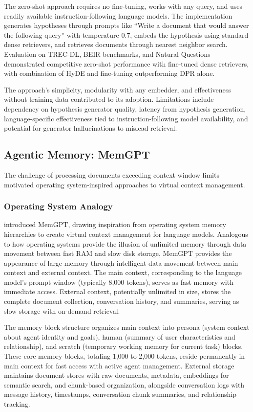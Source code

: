 The zero-shot approach requires no fine-tuning, works with any query, and uses readily available instruction-following language models. The implementation generates hypotheses through prompts like ``Write a document that would answer the following query'' with temperature 0.7, embeds the hypothesis using standard dense retrievers, and retrieves documents through nearest neighbor search. Evaluation on TREC-DL, BEIR benchmarks, and Natural Questions demonstrated competitive zero-shot performance with fine-tuned dense retrievers, with combination of HyDE and fine-tuning outperforming DPR alone.

The approach's simplicity, modularity with any embedder, and effectiveness without training data contributed to its adoption. Limitations include dependency on hypothesis generator quality, latency from hypothesis generation, language-specific effectiveness tied to instruction-following model availability, and potential for generator hallucinations to mislead retrieval.

\subsection{Agentic Memory: MemGPT}

The challenge of processing documents exceeding context window limits motivated operating system-inspired approaches to virtual context management.

\subsubsection{Operating System Analogy}

\citet{packer2023memgpt} introduced MemGPT, drawing inspiration from operating system memory hierarchies to create virtual context management for language models. Analogous to how operating systems provide the illusion of unlimited memory through data movement between fast RAM and slow disk storage, MemGPT provides the appearance of large memory through intelligent data movement between main context and external context. The main context, corresponding to the language model's prompt window (typically 8,000 tokens), serves as fast memory with immediate access. External context, potentially unlimited in size, stores the complete document collection, conversation history, and summaries, serving as slow storage with on-demand retrieval.

The memory block structure organizes main context into persona (system context about agent identity and goals), human (summary of user characteristics and relationship), and scratch (temporary working memory for current task) blocks. These core memory blocks, totaling 1,000 to 2,000 tokens, reside permanently in main context for fast access with active agent management. External storage maintains document stores with raw documents, metadata, embeddings for semantic search, and chunk-based organization, alongside conversation logs with message history, timestamps, conversation chunk summaries, and relationship tracking.

